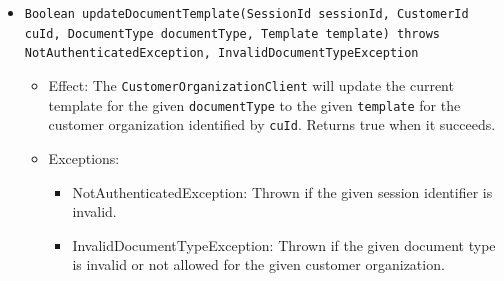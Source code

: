 \documentclass[a4paper,10pt]{article}
\begin{document}
\begin{itemize}
\begin{itemize}
   	\item \texttt{Boolean updateDocumentTemplate(SessionId sessionId, CustomerId cuId, DocumentType documentType, Template template) throws NotAuthenticatedException, InvalidDocumentTypeException}
        \begin{itemize}
            \item Effect: The \texttt{CustomerOrganizationClient} will update the current template for the given \texttt{documentType} to the given \texttt{template} for the customer organization identified by \texttt{cuId}. Returns true when it succeeds.
            \item Exceptions:
            \begin{itemize}
            	\item NotAuthenticatedException: Thrown if the given session identifier is invalid.
            	\item InvalidDocumentTypeException: Thrown if the given document type is invalid or not allowed for the given customer organization.
            \end{itemize}
        \end{itemize}        
    \end{itemize}
    

\end{itemize}
\end{document}
